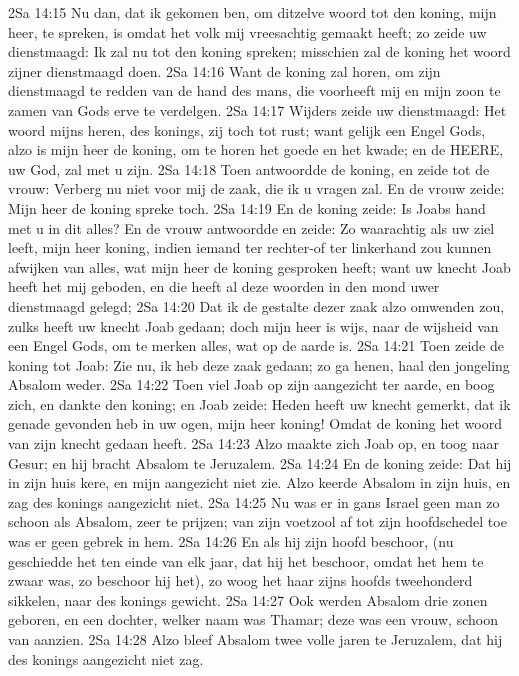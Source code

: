 2Sa 14:15  Nu dan, dat ik gekomen ben, om ditzelve woord tot den koning, mijn heer, te spreken, is omdat het volk mij vreesachtig gemaakt heeft; zo zeide uw dienstmaagd: Ik zal nu tot den koning spreken; misschien zal de koning het woord zijner dienstmaagd doen.
2Sa 14:16  Want de koning zal horen, om zijn dienstmaagd te redden van de hand des mans, die voorheeft mij en mijn zoon te zamen van Gods erve te verdelgen.
2Sa 14:17  Wijders zeide uw dienstmaagd: Het woord mijns heren, des konings, zij toch tot rust; want gelijk een Engel Gods, alzo is mijn heer de koning, om te horen het goede en het kwade; en de HEERE, uw God, zal met u zijn.
2Sa 14:18  Toen antwoordde de koning, en zeide tot de vrouw: Verberg nu niet voor mij de zaak, die ik u vragen zal. En de vrouw zeide: Mijn heer de koning spreke toch.
2Sa 14:19  En de koning zeide: Is Joabs hand met u in dit alles? En de vrouw antwoordde en zeide: Zo waarachtig als uw ziel leeft, mijn heer koning, indien iemand ter rechter-of ter linkerhand zou kunnen afwijken van alles, wat mijn heer de koning gesproken heeft; want uw knecht Joab heeft het mij geboden, en die heeft al deze woorden in den mond uwer dienstmaagd gelegd;
2Sa 14:20  Dat ik de gestalte dezer zaak alzo omwenden zou, zulks heeft uw knecht Joab gedaan; doch mijn heer is wijs, naar de wijsheid van een Engel Gods, om te merken alles, wat op de aarde is.
2Sa 14:21  Toen zeide de koning tot Joab: Zie nu, ik heb deze zaak gedaan; zo ga henen, haal den jongeling Absalom weder.
2Sa 14:22  Toen viel Joab op zijn aangezicht ter aarde, en boog zich, en dankte den koning; en Joab zeide: Heden heeft uw knecht gemerkt, dat ik genade gevonden heb in uw ogen, mijn heer koning! Omdat de koning het woord van zijn knecht gedaan heeft.
2Sa 14:23  Alzo maakte zich Joab op, en toog naar Gesur; en hij bracht Absalom te Jeruzalem.
2Sa 14:24  En de koning zeide: Dat hij in zijn huis kere, en mijn aangezicht niet zie. Alzo keerde Absalom in zijn huis, en zag des konings aangezicht niet.
2Sa 14:25  Nu was er in gans Israel geen man zo schoon als Absalom, zeer te prijzen; van zijn voetzool af tot zijn hoofdschedel toe was er geen gebrek in hem.
2Sa 14:26  En als hij zijn hoofd beschoor, (nu geschiedde het ten einde van elk jaar, dat hij het beschoor, omdat het hem te zwaar was, zo beschoor hij het), zo woog het haar zijns hoofds tweehonderd sikkelen, naar des konings gewicht.
2Sa 14:27  Ook werden Absalom drie zonen geboren, en een dochter, welker naam was Thamar; deze was een vrouw, schoon van aanzien.
2Sa 14:28  Alzo bleef Absalom twee volle jaren te Jeruzalem, dat hij des konings aangezicht niet zag.

